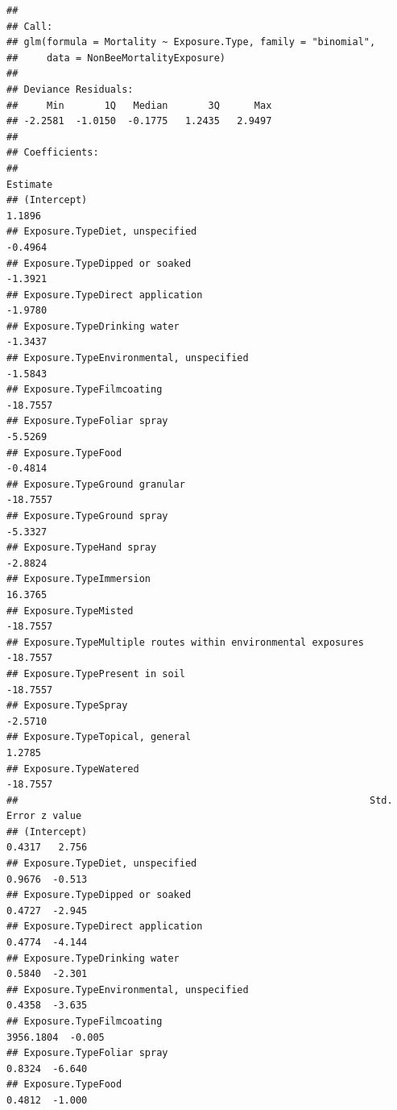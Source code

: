 \documentclass[
  12pt,
]{article}
\begin{document}
\begin{verbatim}
## 
## Call:
## glm(formula = Mortality ~ Exposure.Type, family = "binomial", 
##     data = NonBeeMortalityExposure)
## 
## Deviance Residuals: 
##     Min       1Q   Median       3Q      Max  
## -2.2581  -1.0150  -0.1775   1.2435   2.9497  
## 
## Coefficients:
##                                                              Estimate
## (Intercept)                                                    1.1896
## Exposure.TypeDiet, unspecified                                -0.4964
## Exposure.TypeDipped or soaked                                 -1.3921
## Exposure.TypeDirect application                               -1.9780
## Exposure.TypeDrinking water                                   -1.3437
## Exposure.TypeEnvironmental, unspecified                       -1.5843
## Exposure.TypeFilmcoating                                     -18.7557
## Exposure.TypeFoliar spray                                     -5.5269
## Exposure.TypeFood                                             -0.4814
## Exposure.TypeGround granular                                 -18.7557
## Exposure.TypeGround spray                                     -5.3327
## Exposure.TypeHand spray                                       -2.8824
## Exposure.TypeImmersion                                        16.3765
## Exposure.TypeMisted                                          -18.7557
## Exposure.TypeMultiple routes within environmental exposures  -18.7557
## Exposure.TypePresent in soil                                 -18.7557
## Exposure.TypeSpray                                            -2.5710
## Exposure.TypeTopical, general                                  1.2785
## Exposure.TypeWatered                                         -18.7557
##                                                             Std. Error z value
## (Intercept)                                                     0.4317   2.756
## Exposure.TypeDiet, unspecified                                  0.9676  -0.513
## Exposure.TypeDipped or soaked                                   0.4727  -2.945
## Exposure.TypeDirect application                                 0.4774  -4.144
## Exposure.TypeDrinking water                                     0.5840  -2.301
## Exposure.TypeEnvironmental, unspecified                         0.4358  -3.635
## Exposure.TypeFilmcoating                                     3956.1804  -0.005
## Exposure.TypeFoliar spray                                       0.8324  -6.640
## Exposure.TypeFood                                               0.4812  -1.000

\end{verbatim}
\end{document}
